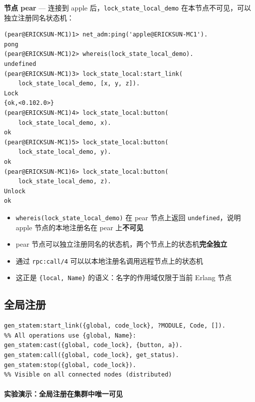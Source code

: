 \documentclass[a4paper,11pt]{article}
\begin{document}
\textbf{节点 pear} --- 连接到 apple 后，\texttt{lock\_state\_local\_demo} 在本节点不可见，可以独立注册同名状态机：

\begin{lstlisting}[style=shellstyle, caption={pear 节点 --- 独立注册同名 gen\_statem}]
(pear@ERICKSUN-MC1)1> net_adm:ping('apple@ERICKSUN-MC1').
pong
(pear@ERICKSUN-MC1)2> whereis(lock_state_local_demo).
undefined
(pear@ERICKSUN-MC1)3> lock_state_local:start_link(
    lock_state_local_demo, [x, y, z]).
Lock
{ok,<0.102.0>}
(pear@ERICKSUN-MC1)4> lock_state_local:button(
    lock_state_local_demo, x).
ok
(pear@ERICKSUN-MC1)5> lock_state_local:button(
    lock_state_local_demo, y).
ok
(pear@ERICKSUN-MC1)6> lock_state_local:button(
    lock_state_local_demo, z).
Unlock
ok
\end{lstlisting}

\begin{tipbox}[本地注册的关键特性]
\begin{itemize}[leftmargin=1.5em]
    \item \texttt{whereis(lock\_state\_local\_demo)} 在 pear 节点上返回 \texttt{undefined}，说明 apple 节点的本地注册名在 pear 上\textbf{不可见}
    \item pear 节点可以独立注册同名的状态机，两个节点上的状态机\textbf{完全独立}
    \item 通过 \texttt{rpc:call/4} 可以以本地注册名调用远程节点上的状态机
    \item 这正是 \texttt{\{local, Name\}} 的语义：名字的作用域仅限于当前 Erlang 节点
\end{itemize}
\end{tipbox}

\subsection{全局注册}

\begin{lstlisting}[style=erlangstyle]
gen_statem:start_link({global, code_lock}, ?MODULE, Code, []).
%% All operations use {global, Name}:
gen_statem:cast({global, code_lock}, {button, a}).
gen_statem:call({global, code_lock}, get_status).
gen_statem:stop({global, code_lock}).
%% Visible on all connected nodes (distributed)
\end{lstlisting}

\paragraph{实验演示：全局注册在集群中唯一可见}
\end{document}
